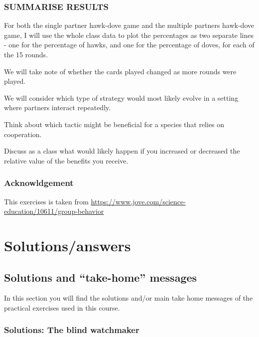 \documentclass[
  a4paper]{book}
\begin{document}
\hypertarget{summarise-results}{%
\section{SUMMARISE RESULTS}\label{summarise-results}}

For both the single partner hawk-dove game and the multiple partners hawk-dove game, I will use the whole class data to plot the percentages as two separate lines - one for the percentage of hawks, and one for the percentage of doves, for each of the 15 rounds.

We will take note of whether the cards played changed as more rounds were played.

We will consider which type of strategy would most likely evolve in a setting where partners interact repeatedly.

Think about which tactic might be beneficial for a species that relies on cooperation.

Discuss as a class what would likely happen if you increased or decreased the relative value of the benefits you receive.

\hypertarget{acknowldgement}{%
\section{Acknowldgement}\label{acknowldgement}}

This exercises is taken from \url{https://www.jove.com/science-education/10611/group-behavior}

\hypertarget{part-solutionsanswers}{%
\part{Solutions/answers}\label{part-solutionsanswers}}

\hypertarget{solutions-and-take-home-messages}{%
\chapter{Solutions and ``take-home'' messages}\label{solutions-and-take-home-messages}}

In this section you will find the solutions and/or main take home messages of the practical exercises used in this course.

\hypertarget{solutions-the-blind-watchmaker}{%
\section{Solutions: The blind watchmaker}\label{solutions-the-blind-watchmaker}}
\end{document}
